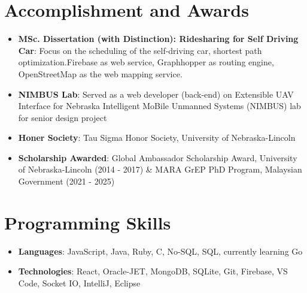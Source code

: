 \documentclass[letterpaper,11pt]{article}
\newcommand{\resumeItem}[2]{
  \item\small{
    \textbf{#1}{: #2 \vspace{-2pt}}
  }
}
\newcommand{\resumeSubItem}[2]{\resumeItem{#1}{#2}\vspace{-4pt}}
\newcommand{\resumeSubHeadingListStart}{\begin{itemize}[leftmargin=*]}
\newcommand{\resumeSubHeadingListEnd}{\end{itemize}}
\begin{document}
\section{Accomplishment and Awards}
  \resumeSubHeadingListStart
    \resumeSubItem{MSc. Dissertation (with Distinction): Ridesharing for Self Driving Car}
      {Focus on the scheduling of the self-driving car, shortest path optimization.Firebase as web service, Graphhopper as routing engine, OpenStreetMap as the  web mapping service. }
    \resumeSubItem{NIMBUS Lab}
      {Served as a web developer (back-end) on Extensible UAV Interface for Nebraska Intelligent MoBile Unmanned Systems (NIMBUS) lab for senior design project}
    \resumeSubItem{Honer Society}
      {Tau Sigma Honor Society, University of Nebraska-Lincoln}
    \resumeSubItem{Scholarship Awarded}
      {Global Ambassador Scholarship Award, University of Nebraska-Lincoln (2014 - 2017) \&
      MARA GrEP PhD Program, Malaysian Government (2021 - 2025)}
  \resumeSubHeadingListEnd

%
\section{Programming Skills}
 \resumeSubHeadingListStart
    \resumeSubItem{Languages}
        {JavaScript, Java, Ruby, C, No-SQL, SQL, currently learning Go}
    \resumeSubItem{Technologies}
        {React, Oracle-JET, MongoDB, SQLite, Git, Firebase, VS Code, Socket IO, IntelliJ, Eclipse}
 \resumeSubHeadingListEnd


\end{document}
